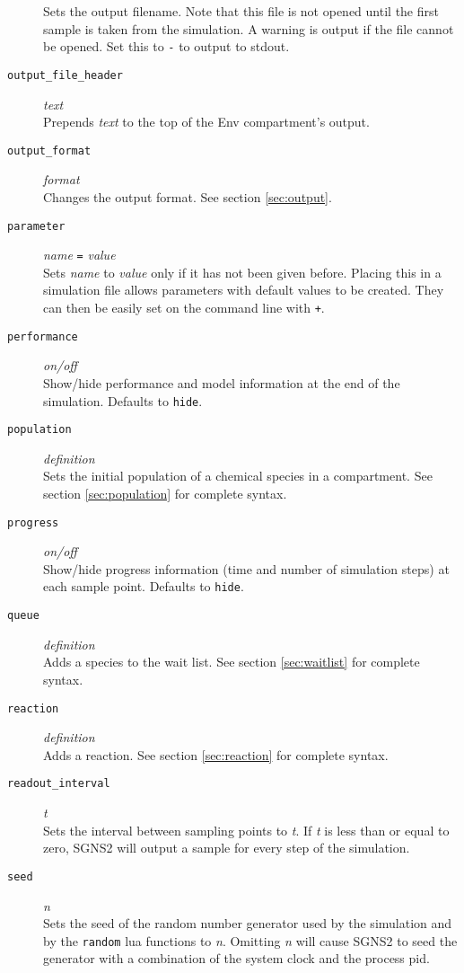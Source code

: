 \documentclass[10pt]{article}
\newcommand{\code}[1]{{\tt {#1}}}
\newcommand{\codeparam}[1]{\textrm{\textit{#1}}}
\newcommand{\programname}{SGNS2}
\begin{document}
\begin{description}
	Sets the output filename. Note that this file is not opened until the first sample is taken from the simulation. A warning is output if the file cannot be opened. Set this to \code{-} to output to stdout.
\item[\code{output\_file\_header}] \codeparam{text} \\
	Prepends \codeparam{text} to the top of the Env compartment's output.
\item[\code{output\_format}] \codeparam{format} \\
	Changes the output format. See section \ref{sec:output}.
\item[\code{parameter}] \codeparam{name} \code{=} \codeparam{value} \\
	Sets \codeparam{name} to \codeparam{value} only if it has not been given before. Placing this in a simulation file allows parameters with default values to be created. They can then be easily set on the command line with \code{+}.
\item[\code{performance}] \codeparam{on/off} \\
	Show/hide performance and model information at the end of the simulation. Defaults to \code{hide}.
\item[\code{population}] \codeparam{definition} \\
	Sets the initial population of a chemical species in a compartment. See section \ref{sec:population} for complete syntax.
\item[\code{progress}] \codeparam{on/off} \\
	Show/hide progress information (time and number of simulation steps) at each sample point. Defaults to \code{hide}.
\item[\code{queue}] \codeparam{definition} \\
	Adds a species to the wait list. See section \ref{sec:waitlist} for complete syntax.
\item[\code{reaction}] \codeparam{definition} \\
	Adds a reaction. See section \ref{sec:reaction} for complete syntax.
\item[\code{readout\_interval}] \codeparam{t} \\
	Sets the interval between sampling points to \codeparam{t}. If \codeparam{t} is less than or equal to zero, {\programname} will output a sample for every step of the simulation.
\item[\code{seed}] \codeparam{n} \\
	Sets the seed of the random number generator used by the simulation and by the \code{random} lua functions to \codeparam{n}. Omitting \codeparam{n} will cause {\programname} to seed the generator with a combination of the system clock and the process pid.

\end{description}
\end{document}
